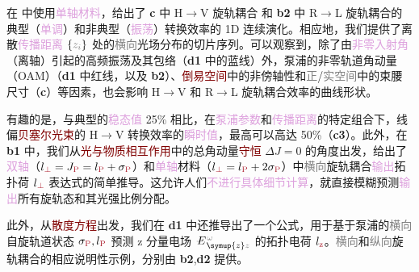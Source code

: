 在  中使用\textcolor{Plum}{单轴材料}，给出了 \textbf{c} 中 H$\to$V \textcolor{NavyBlue}{旋轨耦合} 和 \textbf{b2} 中 R$\to$L \textcolor{NavyBlue}{旋轨耦合}的典型（\textcolor{Plum}{单调}）和非典型（\textcolor{Plum}{振荡}）转换效率的 1D 连续演化。相应地，我们提供了离散\textcolor{Plum}{传播距离} $\{\mathcolor{gray}{z_i}\}$ 处的\textcolor{gray}{横向}\textcolor{PineGreen}{光场分布}的切片序列。可以观察到，除了由\textcolor{Plum}{非零入射角}（\textcolor{PineGreen}{离轴}）引起的高频振荡及其包络（\textbf{d1} 中的蓝线）外，\textcolor{NavyBlue}{泵浦}的\textcolor{NavyBlue}{非零轨道角动量（OAM）}（\textbf{d1} 中红线，以及 \textbf{b2}）、\textcolor{Maroon}{倒易空间}中的\textcolor{PineGreen}{非傍轴性}和\textcolor{gray}{正}/\textcolor{gray}{实空间}中的束腰尺寸（\textbf{c}）等因素，也会影响 H$\to$V 和 R$\to$L \textcolor{NavyBlue}{旋轨耦合}效率的曲线形状。

有趣的是，与典型的\textcolor{Plum}{稳态值} 25\% 相比，在\textcolor{Plum}{泵浦参数}和\textcolor{Plum}{传播距离}的特定组合下，\textcolor{PineGreen}{线偏}\textcolor{Maroon}{贝塞尔光束}的 H$\to$V 转换效率的\textcolor{Plum}{瞬时值}，最高可以高达 50\%\cite{belyiPropagationHighorderCircularly2011,belyiSpintoorbitalAngularMomentum2013,khoninaComparativeInvestigationNonparaxial2015}（\textbf{c3}）。此外，在 \textbf{b1} 中，我们从\textcolor{Maroon}{光与物质相互作用}中的\textcolor{NavyBlue}{总角动量}\textcolor{Maroon}{守恒} $\Delta J = 0$ 的角度出发，给出了\textcolor{Plum}{双轴}（$l_{\textcolor{Maroon}{\perp}}=J_{\textcolor{Maroon}{\text{P}}}=l_{\textcolor{Maroon}{\text{P}}}+\sigma_{\textcolor{Maroon}{\text{P}}}$）\cite{berryOrbitalSpinAngular2005}和\textcolor{Plum}{单轴}材料（$l_{\textcolor{Maroon}{\perp}}=l_{\textcolor{Maroon}{\text{P}}}+2\sigma_{\textcolor{Maroon}{\text{P}}}$）\cite{ciattoniCircularlyPolarizedBeams2003,ciattoniAngularMomentumDynamics2003,tangHarmonicSpinOrbit2020}中\textcolor{gray}{横向}\textcolor{NavyBlue}{旋轨耦合}\textcolor{Plum}{输出}\textcolor{NavyBlue}{拓扑荷} $l_{\textcolor{Maroon}{\perp}}$ 表达式的简单推导。这允许人们\textcolor{Plum}{不进行具体细节计算}，就直接模糊预测\textcolor{Plum}{输出}所有\textcolor{NavyBlue}{旋轨态}和其\textcolor{NavyBlue}{光强比例分配}。

此外，从\textcolor{Maroon}{散度方程}出发，我们在 \textbf{d1} 中还推导出了一个公式，用于基于\textcolor{NavyBlue}{泵浦}的\textcolor{gray}{横向}\textcolor{NavyBlue}{自旋轨道状态} $\sigma_{\textcolor{Maroon}{\text{P}}},l_{\textcolor{Maroon}{\text{P}}}$ 预测 z 分量电场 $\xint{\mathcolor{gray}{-}}{25}{E}^{\;\!\mathcolor{gray}{\omega}}_{\;\! \symup{z} \mathcolor{gray}{z}}$ 的\textcolor{NavyBlue}{拓扑电荷} $l_{\textcolor{Maroon}{\text{z}}}$。\textcolor{gray}{横向}和\textcolor{gray}{纵向}\textcolor{NavyBlue}{旋轨耦合}的相应说明性示例，分别由 \textbf{b2},\textbf{d2} 提供。

